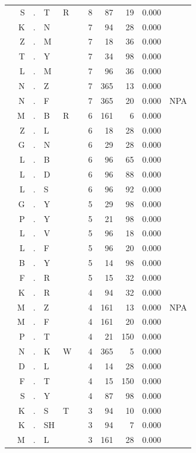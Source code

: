 \documentclass[12pt]{article}
\begin{document}
\begin{longtable}{r@{ } r@{ } c@{ } l@{ } l@{ } l@{ } r r r r l }
 & S & . & T & R &  & 8 & 87 & 19 & 0.000 &  \\
 & K & . & N &  &  & 7 & 94 & 28 & 0.000 &  \\
 & Z & . & M &  &  & 7 & 18 & 36 & 0.000 &  \\
 & T & . & Y &  &  & 7 & 34 & 98 & 0.000 &  \\
 & L & . & M &  &  & 7 & 96 & 36 & 0.000 &  \\
 & N & . & Z &  &  & 7 & 365 & 13 & 0.000 &  \\
 & N & . & F &  &  & 7 & 365 & 20 & 0.000 & \textsc{NPA} \\
 & M & . & B & R &  & 6 & 161 & 6 & 0.000 &  \\
 & Z & . & L &  &  & 6 & 18 & 28 & 0.000 &  \\
 & G & . & N &  &  & 6 & 29 & 28 & 0.000 &  \\
 & L & . & B &  &  & 6 & 96 & 65 & 0.000 &  \\
 & L & . & D &  &  & 6 & 96 & 88 & 0.000 &  \\
 & L & . & S &  &  & 6 & 96 & 92 & 0.000 &  \\
 & G & . & Y &  &  & 5 & 29 & 98 & 0.000 &  \\
 & P & . & Y &  &  & 5 & 21 & 98 & 0.000 &  \\
 & L & . & V &  &  & 5 & 96 & 18 & 0.000 &  \\
 & L & . & F &  &  & 5 & 96 & 20 & 0.000 &  \\
 & B & . & Y &  &  & 5 & 14 & 98 & 0.000 &  \\
 & F & . & R &  &  & 5 & 15 & 32 & 0.000 &  \\
 & K & . & R &  &  & 4 & 94 & 32 & 0.000 &  \\
 & M & . & Z &  &  & 4 & 161 & 13 & 0.000 & \textsc{NPA} \\
 & M & . & F &  &  & 4 & 161 & 20 & 0.000 &  \\
 & P & . & T &  &  & 4 & 21 & 150 & 0.000 &  \\
 & N & . & K & W &  & 4 & 365 & 5 & 0.000 &  \\
 & D & . & L &  &  & 4 & 14 & 28 & 0.000 &  \\
 & F & . & T &  &  & 4 & 15 & 150 & 0.000 &  \\
 & S & . & Y &  &  & 4 & 87 & 98 & 0.000 &  \\
 & K & . & S & T &  & 3 & 94 & 10 & 0.000 &  \\
 & K & . & SH &  &  & 3 & 94 & 7 & 0.000 &  \\
 & M & . & L &  &  & 3 & 161 & 28 & 0.000 &  \\

\end{longtable}
\end{document}
